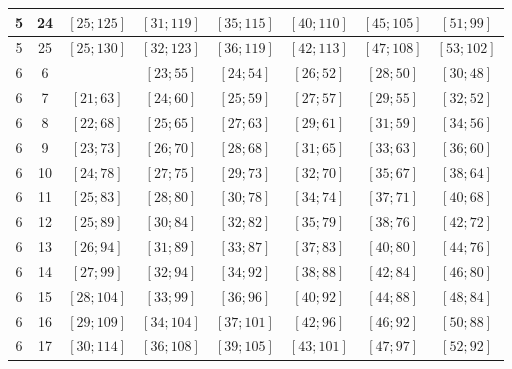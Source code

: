 \documentclass[a4paper,12pt]{article}
\begin{document}
\begin{center}
{\begin{longtable}[H]{|c|c|c|c|c|c|c|c|}
5 &  24 &  $\left[ 25; 125\right]$ &  $\left[ 31; 119\right]$ &  $\left[ 35; 115\right]$ &  $\left[ 40; 110\right]$ &  $\left[ 45; 105\right]$ &  $\left[ 51; 99\right]$ \tabularnewline \hline
5 &  25 &  $\left[ 25; 130\right]$ &  $\left[ 32; 123\right]$ &  $\left[ 36; 119\right]$ &  $\left[ 42; 113\right]$ &  $\left[ 47; 108\right]$ &  $\left[ 53; 102\right]$ \tabularnewline \hline
6 &  6 &   &  $\left[ 23; 55\right]$ &  $\left[ 24; 54\right]$ &  $\left[ 26; 52\right]$ &  $\left[ 28; 50\right]$ &  $\left[ 30; 48\right]$ \tabularnewline \hline
6 &  7 &  $\left[ 21; 63\right]$ &  $\left[ 24; 60\right]$ &  $\left[ 25; 59\right]$ &  $\left[ 27; 57\right]$ &  $\left[ 29; 55\right]$ &  $\left[ 32; 52\right]$ \tabularnewline \hline
6 &  8 &  $\left[ 22; 68\right]$ &  $\left[ 25; 65\right]$ &  $\left[ 27; 63\right]$ &  $\left[ 29; 61\right]$ &  $\left[ 31; 59\right]$ &  $\left[ 34; 56\right]$ \tabularnewline \hline
6 &  9 &  $\left[ 23; 73\right]$ &  $\left[ 26; 70\right]$ &  $\left[ 28; 68\right]$ &  $\left[ 31; 65\right]$ &  $\left[ 33; 63\right]$ &  $\left[ 36; 60\right]$ \tabularnewline \hline
6 &  10 &  $\left[ 24; 78\right]$ &  $\left[ 27; 75\right]$ &  $\left[ 29; 73\right]$ &  $\left[ 32; 70\right]$ &  $\left[ 35; 67\right]$ &  $\left[ 38; 64\right]$ \tabularnewline \hline
6 &  11 &  $\left[ 25; 83\right]$ &  $\left[ 28; 80\right]$ &  $\left[ 30; 78\right]$ &  $\left[ 34; 74\right]$ &  $\left[ 37; 71\right]$ &  $\left[ 40; 68\right]$ \tabularnewline \hline
6 &  12 &  $\left[ 25; 89\right]$ &  $\left[ 30; 84\right]$ &  $\left[ 32; 82\right]$ &  $\left[ 35; 79\right]$ &  $\left[ 38; 76\right]$ &  $\left[ 42; 72\right]$ \tabularnewline \hline
6 &  13 &  $\left[ 26; 94\right]$ &  $\left[ 31; 89\right]$ &  $\left[ 33; 87\right]$ &  $\left[ 37; 83\right]$ &  $\left[ 40; 80\right]$ &  $\left[ 44; 76\right]$ \tabularnewline \hline
6 &  14 &  $\left[ 27; 99\right]$ &  $\left[ 32; 94\right]$ &  $\left[ 34; 92\right]$ &  $\left[ 38; 88\right]$ &  $\left[ 42; 84\right]$ &  $\left[ 46; 80\right]$ \tabularnewline \hline
6 &  15 &  $\left[ 28; 104\right]$ &  $\left[ 33; 99\right]$ &  $\left[ 36; 96\right]$ &  $\left[ 40; 92\right]$ &  $\left[ 44; 88\right]$ &  $\left[ 48; 84\right]$ \tabularnewline \hline
6 &  16 &  $\left[ 29; 109\right]$ &  $\left[ 34; 104\right]$ &  $\left[ 37; 101\right]$ &  $\left[ 42; 96\right]$ &  $\left[ 46; 92\right]$ &  $\left[ 50; 88\right]$ \tabularnewline \hline
6 &  17 &  $\left[ 30; 114\right]$ &  $\left[ 36; 108\right]$ &  $\left[ 39; 105\right]$ &  $\left[ 43; 101\right]$ &  $\left[ 47; 97\right]$ &  $\left[ 52; 92\right]$ \tabularnewline \hline

\end{longtable}}
\end{center}
\end{document}
